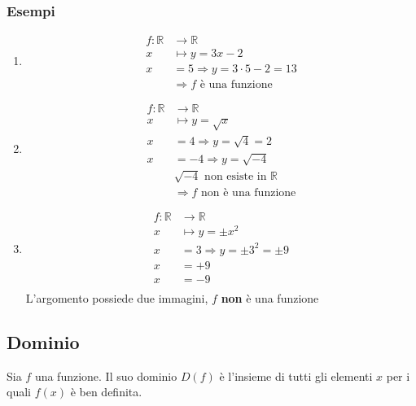 \documentclass[../main.tex]{subfiles}
\begin{document}
\subsubsection{Esempi}
\begin{enumerate}
    \item \begin{align*}
        f: \mathbb{R}& \longrightarrow \mathbb{R} \\
        x& \longmapsto y=3x-2 \\
        x&=5 \Rightarrow y=3\cdot5-2=13 \\
        &\Rightarrow f \text{ è una funzione}
    \end{align*}
    \item \begin{align*}
        f: \mathbb{R}& \longrightarrow \mathbb{R} \\
        x& \longmapsto y=\sqrt{x} \\
        x&=4 \Rightarrow y=\sqrt{4}=2 \\
        x&=-4 \Rightarrow y=\sqrt{-4} \\
        &\sqrt{-4} \text{ non esiste in } \mathbb{R} \\
        &\Rightarrow f \text{ non è una funzione}
    \end{align*}
    \item \begin{align*}
        f: \mathbb{R}& \longrightarrow \mathbb{R} \\
        x& \longmapsto y=\pm x^2 \\
        x&=3 \Rightarrow y=\pm 3^2=\pm 9 \\
        x&=+9 \\
        x&=-9 \\
    \end{align*}
    L'argomento possiede due immagini, $f$ \textbf{non} è una funzione
\end{enumerate}

\pagebreak
\subsection{Dominio}
Sia $f$ una funzione. Il suo dominio $D(f)$ è l'insieme di tutti gli elementi $x$ per i quali $f(x)$ è ben definita.
\end{document}
